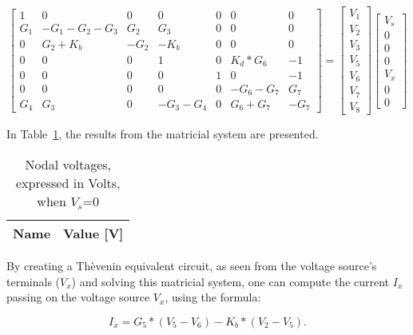 $$
\begin{bmatrix}
  1 & 0 & 0 & 0 & 0 & 0 & 0 \\
  G_{1} & -G_{1}-G_{2}-G_{3} & G_{2} & G_{3} & 0 & 0 & 0 \\
  0 & G_{2}+K_{b} & -G_{2} & -K_{b} & 0 & 0 & 0 \\
  0 & 0 & 0 & 1 & 0 & K_{d}*G_{6} & -1 \\
  0 & 0 & 0 & 0 & 1 & 0 & -1 \\
  0 & 0 & 0 & 0 & 0 & -G_{6}-G_{7} & G_{7} \\
  G_{4} & G_{3} & 0 & -G_{3}-G_{4} & 0 & G_{6}+G_{7} & -G_{7}
\end{bmatrix}
=
\begin{bmatrix}
  V_{1}\\
  V_{2}\\
  V_{3}\\
  V_{5}\\
  V_{6}\\
  V_{7}\\
  V_{8}
\end{bmatrix}
\begin{bmatrix}
  V_{s}\\
  0\\
  0\\
  0\\
  V_{x}\\
  0\\
  0
\end{bmatrix}
$$

In Table~\ref{tab:volt2}, the results from the matricial system are presented.\par

\begin{table} [H]
  \centering
  \begin{tabular}{|l|r|}
    \hline    
    {\bf Name} & {\bf Value [V]} \\ \hline
    
  \end{tabular}
  \caption{Nodal voltages, expressed in Volts, when $V_s$=0}
  \label{tab:volt2}
\end{table}

By creating a Thèvenin equivalent circuit, as seen from the voltage source's
terminals ($V_x$) and solving this matricial system, one can compute the current
$I_x$ passing on the voltage source $V_x$, using the formula:\par

\begin{equation}
  I_x = G_5 * (V_5 - V_6) - K_b * (V_2 - V_5).
  \label{eq:Ix}
\end{equation}

